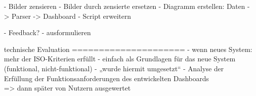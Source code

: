- Bilder zensieren
- Bilder durch zensierte ersetzen
- Diagramm erstellen: Daten -> Parser -> Dashboard
- Script erweitern

- Feedback?
- ausformulieren

technische Evaluation
=====================
- wenn neues System: mehr der ISO-Kriterien erfüllt
- einfach als Grundlagen für das neue System (funktional, nicht-funktional)
- „wurde hiermit umgesetzt“
- Analyse der Erfüllung der Funktionsanforderungen des entwickelten Dashboards\\

=> dann später von Nutzern ausgewertet